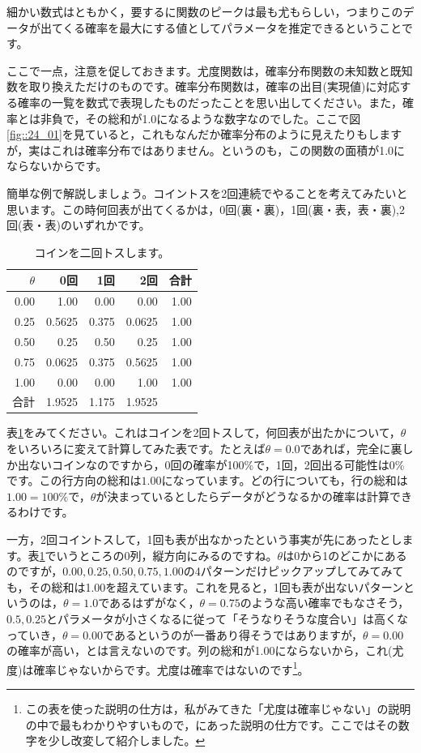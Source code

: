 \documentclass{ltjsbook}
\begin{document}
細かい数式はともかく，要するに関数のピークは最も尤もらしい，つまりこのデータが出てくる確率を最大にする値としてパラメータを推定できるということです。

ここで一点，注意を促しておきます。尤度関数は，確率分布関数の未知数と既知数を取り換えただけのものです。確率分布関数は，確率の出目(実現値)に対応する確率の一覧を数式で表現したものだったことを思い出してください。また，確率とは非負で，その総和が1.0になるような数字なのでした。ここで図\ref{fig::24_01}を見ていると，これもなんだか確率分布のように見えたりもしますが，実はこれは確率分布ではありません。というのも，この関数の面積が1.0にならないからです。

簡単な例で解説しましょう。コイントスを2回連続でやることを考えてみたいと思います。この時何回表が出てくるかは，0回(裏・裏)，1回(裏・表，表・裏),2回(表・表)のいずれかです。

\begin{table}[ht]
	\centering
	\caption{コインを二回トスします。}
	\begin{tabular}{rrrrr}
		\hline
		$\theta$ & 0回     & 1回    & 2回     & 合計   \\
		\hline
		0.00     & 1.00   & 0.00  & 0.00   & 1.00 \\
		0.25     & 0.5625 & 0.375 & 0.0625 & 1.00 \\
		0.50     & 0.25   & 0.50  & 0.25   & 1.00 \\
		0.75     & 0.0625 & 0.375 & 0.5625 & 1.00 \\
		1.00     & 0.00   & 0.00  & 1.00   & 1.00 \\
		\hline
		合計       & 1.9525 & 1.175 & 1.9525 &      \\
		\hline
	\end{tabular}
	\label{tbl::24_01}
\end{table}

表\ref{tbl::24_01}をみてください。これはコインを2回トスして，何回表が出たかについて，$\theta$をいろいろに変えて計算してみた表です。たとえば$\theta=0.0$であれば，完全に裏しか出ないコインなのですから，0回の確率が100\%で，1回，2回出る可能性は0\%です。この行方向の総和は$1.00$になっています。どの行についても，行の総和は$1.00=100\%$で，$\theta$が決まっているとしたらデータがどうなるかの確率は計算できるわけです。

一方，2回コイントスして，1回も表が出なかったという事実が先にあったとします。表\ref{tbl::24_01}でいうところの0列，縦方向にみるのですね。$\theta$は0から1のどこかにあるのですが，$0.00,0.25,0.50,0.75,1.00$の4パターンだけピックアップしてみてみても，その総和は1.00を超えています。これを見ると，1回も表が出ないパターンというのは，$\theta=1.0$であるはずがなく，$\theta=0.75$のような高い確率でもなさそう，$0.5,0.25$とパラメータが小さくなるに従って「そうなりそうな度合い」は高くなっていき，$\theta=0.00$であるというのが一番あり得そうではありますが，$\theta=0.00$の確率が高い，とは言えないのです。列の総和が1.00にならないから，これ(尤度)は確率じゃないからです。尤度は確率ではないのです\footnote{この表を使った説明の仕方は，私がみてきた「尤度は確率じゃない」の説明の中で最もわかりやすいもので，\textcite{lambert2018student}にあった説明の仕方です。ここではその数字を少し改変して紹介しました。}。
\end{document}
